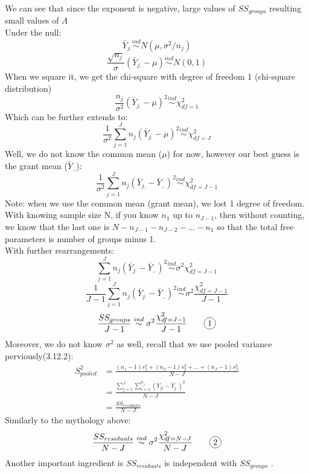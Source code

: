 \documentclass[12pt ]{article}
\newcommand*\circled[1]{\tikz[baseline=(char.base)]{
            \node[shape=circle,draw,inner sep=2pt] (char) {#1};}}
\begin{document}
We can see that since the exponent is negative, large values of $SS_{groups}$ resulting small values of $\Lambda$\\
Under the null: 
\begin{equation*}
\bar{Y}_{j.} \overset{ind}{\sim} N(\mu, \sigma^2 / n_{j})
\end{equation*}
\begin{equation*}
\frac{\sqrt{n_{j}}}{\sigma}(\bar{Y}_{j.} - \mu) \overset{ind}{\sim} N(0, 1) 
\end{equation*}
When we square it, we get the chi-square with degree of freedom 1 (chi-square distribution)
\begin{equation*}
\frac{n_{j}}{\sigma^2}(\bar{Y}_{j.} - \mu)^2 \overset{ind}{\sim} \chi^2_{df=1}
\end{equation*}
Which can be further extends to:
\begin{equation*}
\frac{1}{\sigma^2}\sum_{j=1}^{J} n_{j}(\bar{Y}_{j.} - \mu)^2 \overset{ind}{\sim} \chi^2_{df=J}
\end{equation*}
Well, we do not know the common mean ($\mu$) for now, however our best guess is the grant mean ($\bar{Y}_{..}$):
\begin{equation*}
\frac{1}{\sigma^2}\sum_{j=1}^{J} n_{j}(\bar{Y}_{j.} - \bar{Y}_{..})^2 \overset{ind}{\sim} \chi^2_{df=J - 1}
\end{equation*}
Note: when we use the common mean (grant mean), we lost 1 degree of freedom. With knowing sample size N, if you know $n_{1}$ up to $n_{J-1}$, then without counting, we know that the last one is $N - n_{J-1} - n_{J-2} - \ldots - n_{1}$ so that the total free parameters is number of groups minus 1. \\
With further rearrangements:
\begin{equation*}
\sum_{j=1}^{J} n_{j}(\bar{Y}_{j.} - \bar{Y}_{..})^2 \overset{ind}{\sim} \sigma^2 \chi^2_{df=J - 1}
\end{equation*}
\begin{equation*}
\frac{1}{J-1}\sum_{j=1}^{J} n_{j}(\bar{Y}_{j.} - \bar{Y}_{..})^2 \overset{ind}{\sim} \sigma^2 \frac{\chi^2_{df=J - 1}}{J-1}
\end{equation*}
\begin{equation*}
\frac{SS_{groups}}{J-1} \overset{ind}{\sim} \sigma^2 \frac{\chi^2_{df=J - 1}}{J-1} \tag*{\circled{1}}
\end{equation*}
Moreover, we do not know $\sigma^2$ as well, recall that we use pooled variance perviously(3.12.2):
\begin{align*}
S_{pooled}^2 &= \frac{(n_{1} - 1)s_{1}^2 + (n_{2} - 1)s_{2}^2 + \ldots + (n_{J} - 1)s_{J}^2}{N-J} \\
&= \frac{\sum_{j=1}^{J}\sum^{n_{j}}_{i=1} (Y_{ji} - \bar{Y_{j.}})^2}{N-J} \\ 
&= \frac{SS_{residuals}}{N-J}
\end{align*}
Similarly to the mythology above:
\begin{equation*}
\frac{SS_{residuals}}{N-J} \overset{ind}{\sim} \sigma^2 \frac{\chi^2_{df=N-J}}{N-J} \tag*{\circled{2}}
\end{equation*}
Another important ingredient is $SS_{residuals}$ is independent with $SS_{groups}$ \circled{3}. \\
\end{document}
